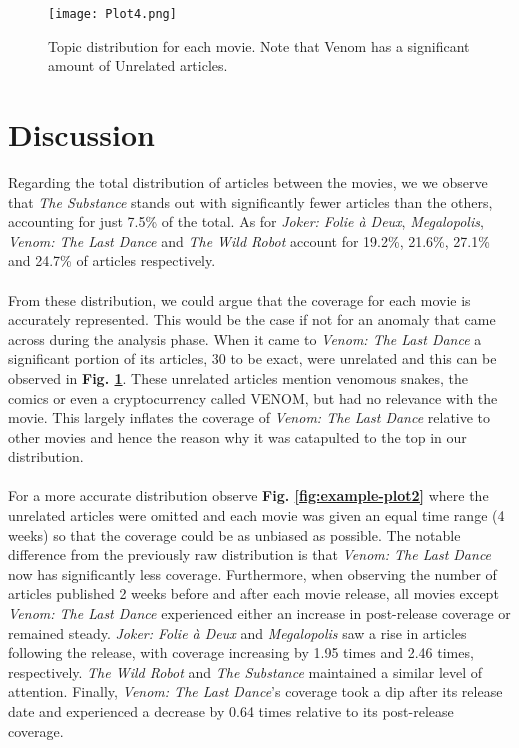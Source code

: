 \documentclass[letterpaper]{article} %
\begin{document}
\begin{figure}
    \centering
    \texttt{[image: Plot4.png]}
    \caption{Topic distribution for each movie. Note that Venom has a significant amount of Unrelated articles.}
    \label{fig:example-plot3}
\end{figure}

\newpage 

\section{Discussion}

Regarding the total distribution of articles between the movies, we we observe that \textit{The Substance} stands out with significantly fewer articles than the others, accounting for just 7.5\% of the total. As for \textit{Joker: Folie à Deux}, \textit{Megalopolis}, \textit{Venom: The Last Dance} and \textit{The Wild Robot} account for 19.2\%, 21.6\%, 27.1\% and 24.7\% of articles respectively. 
\\
\\
From these distribution, we could argue that the coverage for each movie is accurately represented. This would be the case if not for an anomaly that came across during the analysis phase. When it came to \textit{Venom: The Last Dance} a significant portion of its articles, 30 to be exact, were unrelated and this can be observed in \textbf{Fig. \ref{fig:example-plot3}}. These unrelated articles mention venomous snakes, the comics or even a cryptocurrency called VENOM, but had no relevance with the movie. This largely inflates the coverage of \textit{Venom: The Last Dance} relative to other movies and hence the reason why it was catapulted to the top in our distribution. 
\\
\\
For a more accurate distribution observe \textbf{Fig. \ref{fig:example-plot2}} where the unrelated articles were omitted and each movie was given an equal time range (4 weeks) so that the coverage could be as unbiased as possible. The notable difference from the previously raw distribution is that \textit{Venom: The Last Dance} now has significantly less coverage. Furthermore, when observing the number of articles published 2 weeks before and after each movie release, all movies except \textit{Venom: The Last Dance} experienced either an increase in post-release coverage or remained steady. \textit{Joker: Folie à Deux} and \textit{Megalopolis} saw a rise in articles following the release, with coverage increasing by 1.95 times and 2.46 times, respectively. \textit{The Wild Robot} and \textit{The Substance} maintained a similar level of attention. Finally, \textit{Venom: The Last Dance}'s coverage took a dip after its release date and experienced a decrease by 0.64 times relative to its post-release coverage. 
\end{document}
